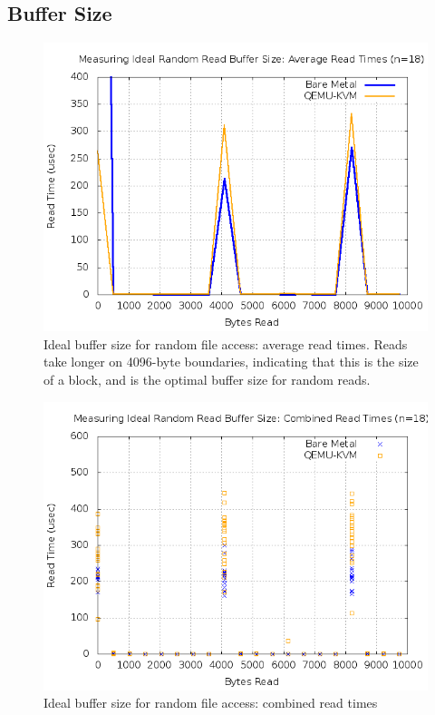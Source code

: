 \documentclass[letterpaper,twocolumn,10pt]{article}
\begin{document}
\subsection{Buffer Size}
\begin{figure}[!ht]
\includegraphics[scale=.35]{combined_graphs/random_avg.png}
\caption{Ideal buffer size for random file access: average read times. Reads take longer on 4096-byte boundaries, indicating that this is the size of a block, and is the optimal buffer size for random reads.}
\end{figure}
\begin{figure}[!ht]
\includegraphics[scale=.35]{combined_graphs/random_combined.png}
\caption{Ideal buffer size for random file access: combined read times}
\end{figure}
\end{document}
